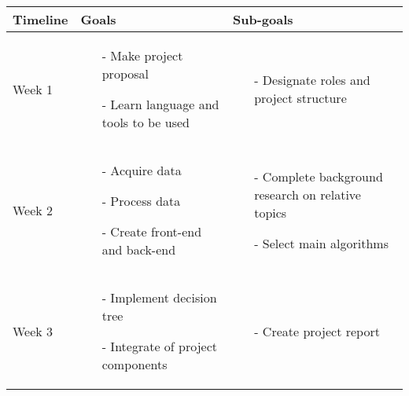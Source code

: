 \documentclass{article}
\begin{document}
\begin{itemize}
    \begin{table}[]
        \centering
        \begin{tabularx}{\linewidth}{  |p{}%
        |p{}%
        |p{}|%
          }
        \hline
        \textbf{Timeline} & \textbf{Goals} & \textbf{Sub-goals} \\
        \hline
        Week 1 
        & 
        \begin{itemize}[leftmargin=*]
            \item[-] Make project proposal 
            \item[-] Learn language and tools to be used  
        \end{itemize} 
        & 
        \begin{itemize}[leftmargin=*] 
            \item[-]Designate roles and project structure
        \end{itemize}    
        \\
        \hline
        Week 2 
        & 
        \begin{itemize}[leftmargin=*] 
            \item[-] Acquire data
            \item[-] Process data
            \item[-] Create front-end and back-end
        \end{itemize} 
        & 
        \begin{itemize}[leftmargin=*] 
            \item[-] Complete background research on relative topics
            \item[-] Select main algorithms
        \end{itemize}        
        \\
        
        \hline
        Week 3 
        & 
        \begin{itemize}[leftmargin=*] 
            \item[-] Implement decision tree
            \item[-] Integrate of project components
        \end{itemize}
        & 
        \begin{itemize}[leftmargin=*] 
        \item[-] Create project report
        \end{itemize}
        \\
        

\end{tabularx}
\end{table}
\end{itemize}
\end{document}
